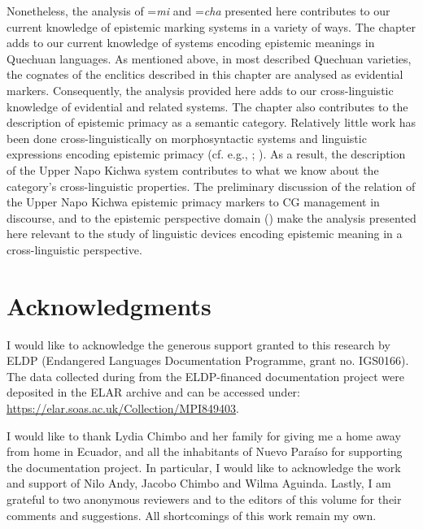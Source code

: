 \documentclass[output=paper]{langscibook}
\begin{document}
Nonetheless, the analysis of =\textit{mi} and =\textit{cha} presented here contributes to our current knowledge of epistemic marking systems in a variety of ways. The chapter adds to our current knowledge of systems encoding epistemic meanings in Quechuan languages. As mentioned above, in most described Quechuan varieties, the cognates of the enclitics described in this chapter are analysed as evidential markers. Consequently, the analysis provided here adds to our cross-linguistic knowledge of evidential and related systems. The chapter also contributes to the description of epistemic primacy as a semantic category. Relatively little work has been done cross-linguistically on morphosyntactic systems and linguistic expressions encoding epistemic primacy (cf. e.g., \citealt{Stivers2011}; \citealt{Hayano2011}). As a result, the description of the Upper Napo Kichwa system contributes to what we know about the category’s cross-linguistic properties. The preliminary discussion of the relation of the Upper Napo Kichwa epistemic primacy markers to CG management in discourse, and to the epistemic perspective domain (\citealt{Bergqvist2017}) make the analysis presented here relevant to the study of linguistic devices encoding epistemic meaning in a cross-linguistic perspective.

\section*{Acknowledgments}

I would like to acknowledge the generous support granted to this research by ELDP (Endangered Languages Documentation Programme, grant no. IGS0166). The data collected during from the ELDP-financed documentation project were deposited in the ELAR archive and can be accessed under: \url{https://elar.soas.ac.uk/Collection/MPI849403}.

I would like to thank Lydia Chimbo and her family for giving me a home away from home in Ecuador, and all the inhabitants of Nuevo Paraíso for supporting the documentation project. In particular, I would like to acknowledge the work and support of Nilo Andy, Jacobo Chimbo and Wilma Aguinda. Lastly, I am grateful to two anonymous reviewers and to the editors of this volume for their comments and suggestions. All shortcomings of this work remain my own.
 
 
\end{document}
